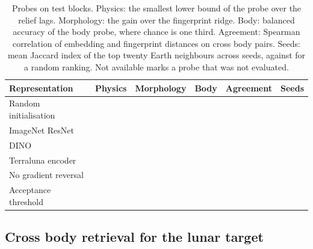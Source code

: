 \begin{table}[tbp]
\centering
\caption{Probes on test blocks. Physics: the smallest lower bound of the probe \Rsq{} over the
relief lags. Morphology: the \Rsq{} gain over the fingerprint ridge. Body: balanced accuracy of the
body probe, where chance is one third. Agreement: Spearman correlation of embedding and fingerprint
distances on cross body pairs. Seeds: mean Jaccard index of the top twenty Earth neighbours across
seeds, against \RandomSeedJaccard{} for a random ranking. Not available marks a probe that was not
evaluated.}
\label{tab:probes}
\footnotesize
\begin{tabular}{@{}lccccc@{}}
\toprule
Representation & Physics & Morphology & Body & Agreement & Seeds \\
\midrule
Random initialisation & \RandomPhysRReliefMin{} & \NotAvailable{} & \RandomBodyAcc{} & \RandomAgreementRho{} & \NotAvailable{} \\
ImageNet ResNet & \ResNetPhysRReliefMin{} & \NotAvailable{} & \NotAvailable{} & \NotAvailable{} & \NotAvailable{} \\
DINO & \DinoPhysRReliefMin{} & \NotAvailable{} & \NotAvailable{} & \NotAvailable{} & \NotAvailable{} \\
Terraluna encoder & \EncoderPhysRReliefMin{} & \EncoderMorphGain{} & \EncoderBodyAcc{} & \EncoderAgreementRho{} & \EncoderSeedJaccard{} \\
No gradient reversal & \VarLambdaZeroPhysR{} & \NotAvailable{} & \NoAdvBodyAcc{} & \VarLambdaZeroRho{} & \NotAvailable{} \\
\midrule
Acceptance threshold & \GFivePhysRMin{} & \GFiveMorphGainMin{} & \GFiveBodyAccMax{} & \GFiveRhoMin{} & \GFiveJaccardMin{} \\
\bottomrule
\end{tabular}
\end{table}

\subsection{Cross body retrieval for the lunar target}
\label{sec:results-moon}
\label{sec:results-retrieval}

